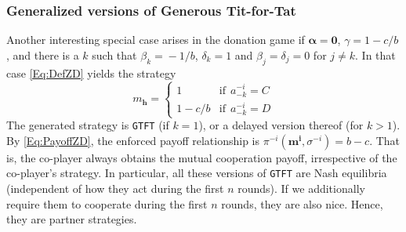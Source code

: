 \documentclass[9pt,twoside,lineno]{pnas-new}
\theoremstyle{plainCl1}
\theoremstyle{plainCl2}
\def\gtft{\texttt{GTFT}}
\begin{document}
\subsubsection*{Generalized versions of Generous Tit-for-Tat}
Another interesting special case arises in the donation game if $\boldsymbol{\alpha}\!=\! \boldsymbol{0}$, $\gamma\!=\!1\!-\!c/b$, and there is a $k$ such that $\beta_k\!=\!-1/b$, $\delta_k\!=\!1$ and $\beta_j\!=\!\delta_j\!=\!0$ for $j\!\neq\!k$. 
 In that case \eqref{Eq:DefZD} yields the strategy
\begin{equation*}
m_\mathbf{h} = \left\{
\begin{array}{ll}
1	&\text{if}~~a^{-i}_{-k}=C\\[0.2cm]
1-c/b	&\text{if}~~a^{-i}_{-k}=D
\end{array}
\right.
\end{equation*}
The generated strategy is \gtft{} (if $k\!=\!1$), or a delayed version
thereof (for $k\!>\!1$). By \eqref{Eq:PayoffZD}, the enforced payoff
relationship is $\pi^{-i}(\mathbf{m^{i}}, \sigma^{-i})\!=\!b\!-\!c$. 
That is, the co-player always obtains the mutual cooperation payoff, irrespective of the co-player's strategy. 
In particular, all these versions of \gtft{} are Nash equilibria  (independent of how they act during the first $n$ rounds).
If we additionally require them to cooperate during the first $n$ rounds, they are also nice. 
Hence, they are partner strategies.\\

\noindent
\end{document}
